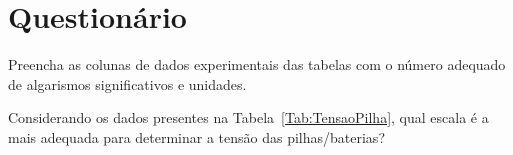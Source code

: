 \cleardoublepage


\vspace{15mm}

\begin{fullwidth}
\noindent{}
\vspace{5mm}

\noindent{}

\noindent{}

\noindent{}

\noindent{}

\noindent{}
\end{fullwidth}

\vspace{5mm}

\section{Questionário}

\begin{question}[type={exam}]{2.5}
Preencha as colunas de dados experimentais das tabelas com o número adequado de algarismos significativos e unidades.
\end{question}

\begin{question}[type={exam}]{2.5}
Considerando os dados presentes na Tabela~\ref{Tab:TensaoPilha}, qual escala é a mais adequada para determinar a tensão das pilhas/baterias?
\end{question}

